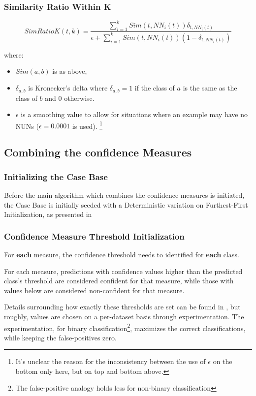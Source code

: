 \documentclass[a4paper,11pt]{report}
\begin{document}
\subsubsection{Similarity Ratio Within K}
\[
SimRatioK(t,k)=\frac{\sum_{i=1}^{k}Sim(t,NN_{i}(t))\delta_{t,NN_{i}(t)}}{\epsilon+\sum_{i=1}^{k}Sim(t,NN_{i}(t))(1-\delta_{t,NN_{i}(t)})}
\]

where:
\begin{itemize}
	\item $Sim(a, b)$ is as above, 
	\item $\delta_{a, b}$ is Kronecker's delta where $\delta_{a, b}=1$ if the class of $a$ is the same as the class of $b$ and $0$ otherwise. 
	\item $\epsilon$ is a smoothing value to allow for situations where an example may have no NUNs ($\epsilon = 0.0001$ is used). \footnote{It's unclear the reason for the inconsistency between the use of $\epsilon$ on the bottom only here, but on top and bottom above.}
\end{itemize}


\subsection{Combining the confidence Measures}
\subsubsection{Initializing the Case Base}
Before the main algorithm which combines the confidence measures is initiated, the Case Base is initially seeded with a Deterministic variation on Furthest-First Initialization, as presented in \citet{Greene2007}

\subsubsection{Confidence Measure Threshold Initialization}
For \textbf{each} measure, the confidence threshold needs to identified for \textbf{each} class.

For each measure, predictions with confidence values higher than the predicted class's threshold are considered confident for that measure, while those with values below are considered non-confident for that measure.

Details surrounding how exactly these thresholds are set can be found in \citet{Delany2005}, but roughly, values are chosen on a per-dataset basis through experimentation. The experimentation, for binary classification\footnote{The false-positive analogy holds less for non-binary classification}, maximizes the correct classifications, while keeping the false-positives zero.
\end{document}
